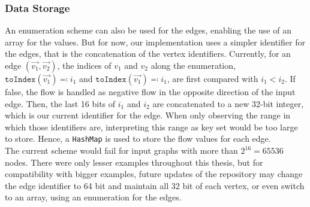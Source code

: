 \subsubsection{Data Storage}
An enumeration scheme can also be used for the edges, enabling the use of an array for the values. But for now, our implementation uses a simpler identifier for the edges, that is the concatenation of the vertex identifiers. Currently, for an edge $(\vec{v_1},\vec{v_2})$, the indices of $v_1$ and $v_2$ along the enumeration, $\texttt{toIndex}(\vec{v_1})\eqqcolon i_1$ and $\texttt{toIndex}(\vec{v_1})\eqqcolon i_1$, are first compared with $i_1<i_2$. If false, the flow is handled as negative flow in the opposite direction of the input edge. Then, the last 16 bits of $i_1$ and $i_2$ are concatenated to a new 32-bit integer, which is our current identifier for the edge. When only observing the range in which those identifiers are, interpreting this range as key set would be too large to store. Hence, a \texttt{HashMap} is used to store the flow values for each edge. \\
The current scheme would fail for input graphs with more than $2^{16}=65536$ nodes. There were only lesser examples throughout this thesis, but for compatibility with bigger examples, future updates of the repository may change the edge identifier to 64 bit and maintain all 32 bit of each vertex, or even switch to an array, using an enumeration for the edges.

